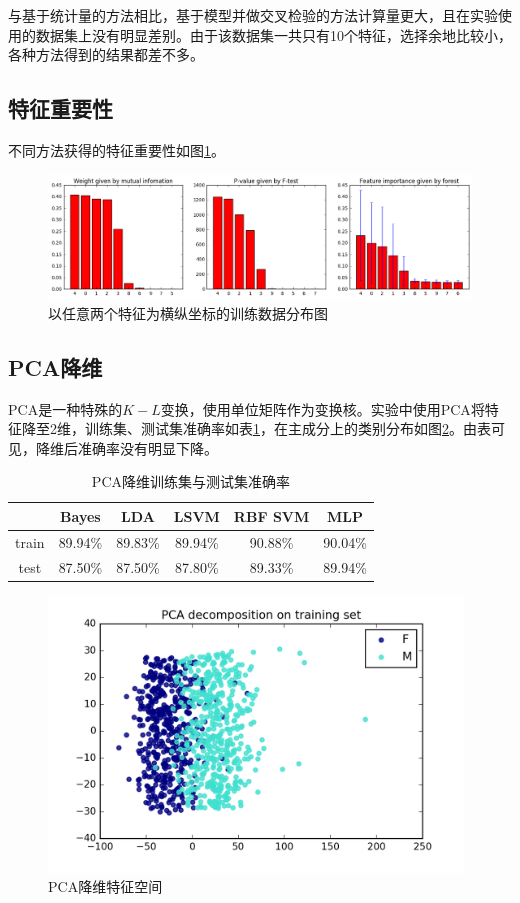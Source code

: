	与基于统计量的方法相比，基于模型并做交叉检验的方法计算量更大，且在实验使用的数据集上没有明显差别。由于该数据集一共只有10个特征，选择余地比较小，各种方法得到的结果都差不多。

	\subsection{特征重要性}
	不同方法获得的特征重要性如图\ref{fig:feature_importance}。

	\begin{figure}
	\centering
	\includegraphics[width=16cm]{resource/feature_importance.png}
	\caption{以任意两个特征为横纵坐标的训练数据分布图}
	\label{fig:feature_importance}
	\end{figure}

	\subsection{PCA降维}
	{\ttfamily PCA}是一种特殊的$K-L$变换，使用单位矩阵作为变换核。实验中使用{\ttfamily PCA}将特征降至2维，训练集、测试集准确率如表\ref{tab:pca}，在主成分上的类别分布如图\ref{fig:pca_decomposition}。由表可见，降维后准确率没有明显下降。
	\begin{table}[htbp]
	\centering
	\begin{tabular}{cccccc}
	\toprule
	{} &   Bayes &     LDA &    LSVM & RBF SVM &     MLP \\
	\midrule
	train &  89.94\% &  89.83\% &  89.94\% &  90.88\% &  90.04\% \\
	test  &  87.50\% &  87.50\% &  87.80\% &  89.33\% &  89.94\% \\
	\bottomrule
	\end{tabular}
	\caption{PCA降维训练集与测试集准确率}
	\label{tab:pca}
	\end{table}

	\begin{figure}
	\centering
	\includegraphics[width=11cm]{resource/pca_decomposition.png}
	\caption{PCA降维特征空间}
	\label{fig:pca_decomposition}
	\end{figure}

